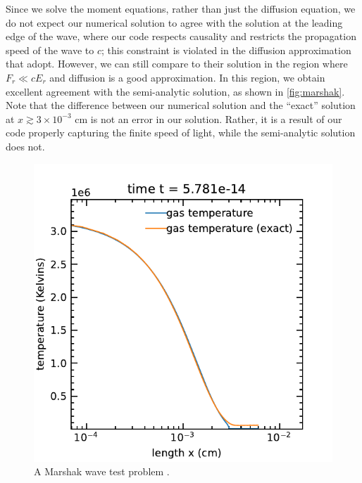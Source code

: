 \documentclass[fleqn,usenatbib]{mnras}
\begin{document}
Since we solve the moment equations, rather than just the diffusion equation, we do not expect our numerical solution to agree with the \citeauthor{Su_1996} solution at the leading edge of the wave, where our code respects causality and restricts the propagation speed of the wave to $c$; this constraint is violated in the diffusion approximation that \citeauthor{Su_1996} adopt. However, we can still compare to their solution in the region where $F_r \ll cE_r$ and diffusion is a good approximation. In this region, we obtain excellent agreement with the semi-analytic solution, as shown in \autoref{fig:marshak}. Note that the difference between our numerical solution and the ``exact'' solution at $x \gtrsim 3\times 10^{-3}$ cm is not an error in our solution. Rather, it is a result of our code properly capturing the finite speed of light, while the semi-analytic solution does not.
\begin{figure}
    \includegraphics[width=\columnwidth]{marshak_wave_cgs_gastemperature.pdf}
    \caption{A Marshak wave test problem \citep{Su_1996}.}
    \label{fig:marshak}
\end{figure}
\end{document}
